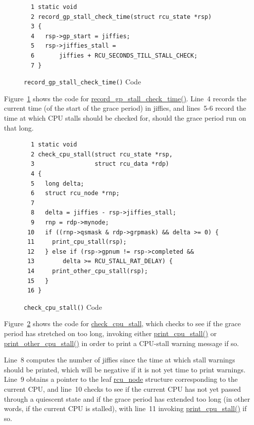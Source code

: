 \begin{figure}[tbp]
{ \scriptsize
\begin{verbatim}
  1 static void
  2 record_gp_stall_check_time(struct rcu_state *rsp)
  3 {
  4   rsp->gp_start = jiffies;
  5   rsp->jiffies_stall =
  6       jiffies + RCU_SECONDS_TILL_STALL_CHECK;
  7 }
\end{verbatim}
}
\caption{{\tt record\_gp\_stall\_check\_time()} Code}
\label{fig:app:rcuimpl:rcutreewt:Code for record-gp-stall-check-time}
\end{figure}

Figure~\ref{fig:app:rcuimpl:rcutreewt:Code for record-gp-stall-check-time}
shows the code for \url{record_gp_stall_check_time()}.
Line~4 records the current time (of the start of the grace period)
in jiffies, and lines~5-6 record the time at which CPU stalls should
be checked for, should the grace period run on that long.

\begin{figure}[tbp]
{ \scriptsize
\begin{verbatim}
  1 static void
  2 check_cpu_stall(struct rcu_state *rsp,
  3                 struct rcu_data *rdp)
  4 {
  5   long delta;
  6   struct rcu_node *rnp;
  7
  8   delta = jiffies - rsp->jiffies_stall;
  9   rnp = rdp->mynode;
 10   if ((rnp->qsmask & rdp->grpmask) && delta >= 0) {
 11     print_cpu_stall(rsp);
 12   } else if (rsp->gpnum != rsp->completed &&
 13        delta >= RCU_STALL_RAT_DELAY) {
 14     print_other_cpu_stall(rsp);
 15   }
 16 }
\end{verbatim}
}
\caption{{\tt check\_cpu\_stall()} Code}
\label{fig:app:rcuimpl:rcutreewt:Code for check-cpu-stall}
\end{figure}

Figure~\ref{fig:app:rcuimpl:rcutreewt:Code for check-cpu-stall}
shows the code for \url{check_cpu_stall}, which checks to see
if the grace period has stretched on too long, invoking either
\url{print_cpu_stall()} or \url{print_other_cpu_stall()} in order
to print a CPU-stall warning message if so.

Line~8 computes the number of jiffies since the time at which stall
warnings should be printed, which will be negative if it is not
yet time to print warnings.
Line~9 obtains a pointer to the leaf \url{rcu_node}
structure corresponding to the current CPU,
and line~10 checks to see if the current CPU has not yet passed through
a quiescent state and if the grace period has extended too long
(in other words, if the current CPU is stalled),
with line~11 invoking \url{print_cpu_stall()} if so.


